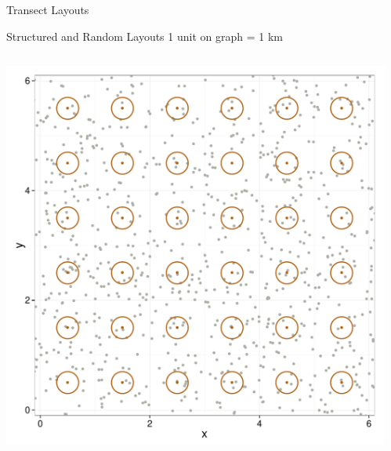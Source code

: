 \documentclass{beamer}
\begin{document}
\begin{frame}{Transect Layouts}
\end{frame}

\begin{frame}{Structured and Random Layouts}
1 unit on graph = 1 km
	\begin{columns}
		\begin{column}{0.48\textwidth}
			\includegraphics[width=\textwidth]{../images/slides-layoutS.pdf}
		\end{column}
		\begin{column}{0.48\textwidth}

\end{column}
\end{columns}
\end{frame}
\end{document}
